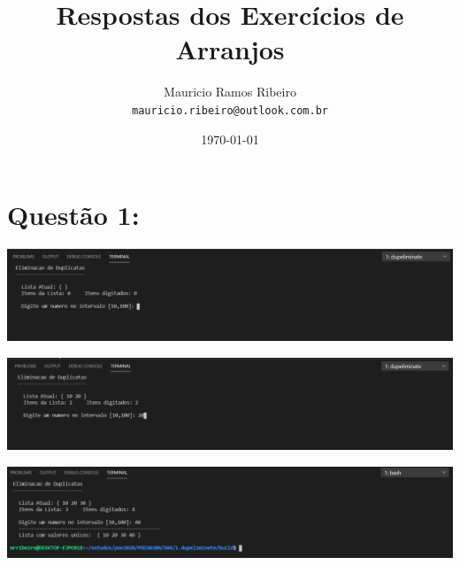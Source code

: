 \documentclass{article}
\author{
  Mauricio Ramos Ribeiro\\
  \texttt{mauricio.ribeiro@outlook.com.br}
}
\title{Respostas dos Exercícios de Arranjos}
\date{\today}
\begin{document}
\maketitle

\vspace{15mm}


\section*{Questão 1:}

\includegraphics[scale=0.6]{01.1.png}

\includegraphics[scale=0.6]{01.2.png}

\includegraphics[scale=0.6]{01.3.png}
\vspace{15mm}
\end{document}
